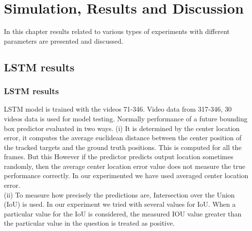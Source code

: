 \chapter{Simulation, Results and Discussion}
In this chapter results related to various types of experiments with different parameters are presented and discussed.

\section{LSTM results}
\subsection{LSTM results}
LSTM model is trained with the videos 71-346. Video data from 317-346, 30 videos data is used for model testing. Normally performance of a future bounding box predictor evaluated  in two ways. 
(i) It is determined by the center location error, it computes the average
euclidean distance between the center position of the tracked targets and the ground truth
positions. This is computed for all the frames. But this However if the predictor predicts 
output location sometimes randomly, then the average center location error value does not measure the
true performance correctly. In our experimented we have used averaged center location error. \\

(ii) To measure how precisely the predictions are, Intersection over the Union (IoU) is used. In our experiment we tried with several values for IoU. When a particular value for the IoU is considered, the measured IOU value greater than the particular value in the question is treated as positive.


